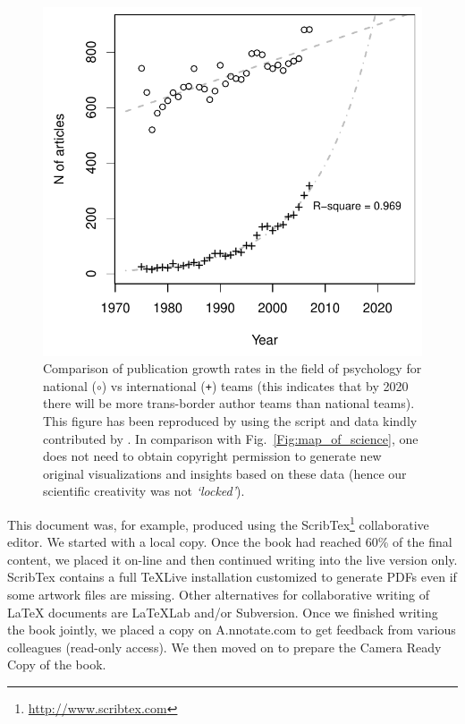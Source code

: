 \documentclass[graybox,envcountchap,sectrefs,UStrade]{svmono}
\begin{document}
\begin{figure}[!htb]
\begin{center}
  \includegraphics[width=.7\textwidth]{Fig_figure_from_Kliegl.pdf}
\caption{Comparison of publication growth rates in the field of psychology for national ($\mathtt \circ$) vs international (\texttt{+}) teams (this indicates that by 2020 there will be more trans-border author teams than national teams). This figure has been reproduced by using the script and data kindly contributed by \citet{Kliegl2011Scientometrics}. In comparison with Fig.\@~\ref{Fig:map_of_science}, one does not need to obtain copyright permission to generate new original visualizations and insights based on these data (hence our scientific creativity was not \emph{`locked'}).} \label{Fig:figure_from_Kliegl}
\end{center}
\end{figure}

This document was, for example, produced using the \textsf{ScribTex}\footnote{\url{http://www.scribtex.com}} collaborative editor. We started with a local copy. Once the book had reached 60\% of the final content, we placed it on-line and then continued writing into the live version only. \textsf{ScribTex} contains a full \textsf{TeXLive} installation customized to generate PDFs even if some artwork files are missing. Other alternatives for collaborative writing of {\LaTeX} documents are \textsf{LaTeXLab} and/or \textsf{Subversion}. Once we finished writing the book jointly, we placed a copy on \textsf{A.nnotate.com} to get feedback from various colleagues (read-only access). We then moved on to prepare the Camera Ready Copy of the book.\par
\end{document}
